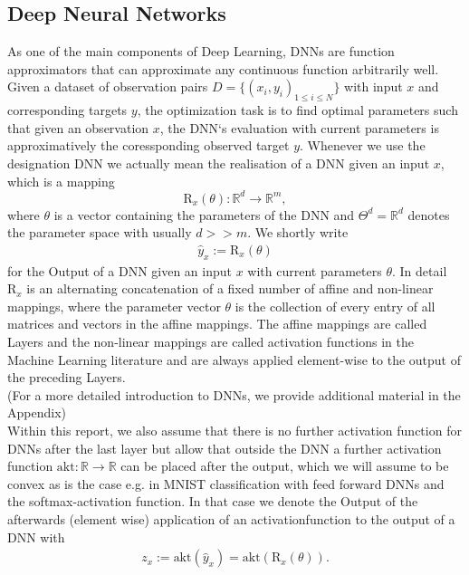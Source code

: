 \documentclass[conference]{IEEEtran}
\begin{document}
\subsection{Deep Neural Networks}
As one of the main components of Deep Learning, DNNs are function approximators that can approximate any continuous function arbitrarily well. Given a dataset of observation pairs $D =\{(x_{i}, y_{i})_{1\leq i\leq N}\}$ with input ${x}$ and corresponding targets $y$, the optimization task is to find optimal parameters such that given an observation $x$, the DNN`s evaluation with current parameters is approximatively the coressponding observed target $y$.  Whenever we use the designation
DNN we actually mean the realisation of a DNN given an input $x$, which is a mapping
$$\mathrm{R}_{x}(\theta):\mathbb{R}^{d}\rightarrow\mathbb{R}^{m},$$
where $\theta$ is a vector containing the parameters of the DNN and $\Theta^{d}=\mathbb{R}^{d}$ denotes the parameter space with usually $d >> m$. We shortly write 
\begin{align} 
\hat{y}_{x} := \mathrm{R}_{x}(\theta)
\end{align}
for the Output of a DNN given an input $x$ with current parameters $\theta$. In detail $\mathrm{R}_{x}$ is an alternating concatenation of a fixed number of affine and non-linear mappings, where the parameter vector $\theta$ is the collection of every entry of all matrices and vectors in the affine mappings. The affine mappings are called Layers and the non-linear mappings are called activation functions in the Machine Learning literature and are always applied element-wise to the output of the preceding Layers. \\
(For a more detailed introduction to DNNs, we provide additional material in the Appendix)\\
Within this report, we also assume that there is no further activation function for DNNs after the last layer but allow that outside the DNN a further activation function $\text{akt}:\mathbb{R}\rightarrow\mathbb{R}$ can be placed after the output, which we will assume to be convex as is the case e.g. in MNIST classification with feed forward DNNs and the softmax-activation function.
In that case we denote the Output of the afterwards (element wise) application of an activationfunction to the output of a DNN with
\begin{align}
z_{x} := \text{akt}(\hat{y}_{x}) = \text{akt}(\mathrm{R}_{x}(\theta)).
\end{align}
\end{document}
